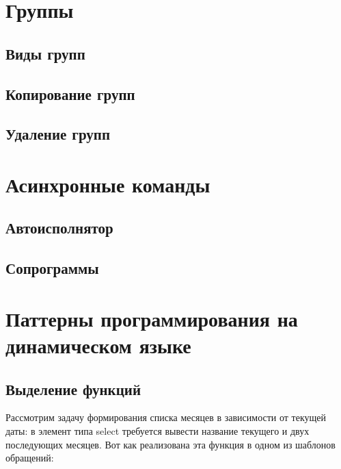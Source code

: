 \documentclass[10pt]{book}
\begin{document}
	\chapter{Группы}
	
	\section{Виды групп}
	
	\section{Копирование групп}
	
	\section{Удаление групп}
	
	\chapter{Асинхронные команды}
	
	\section{Автоисполнятор}
	
	\section{Сопрограммы}

	\chapter{Паттерны программирования на динамическом языке}
	
	\section{Выделение функций}
	
Рассмотрим задачу формирования списка месяцев в зависимости от текущей даты: в элемент типа select требуется вывести название текущего и двух последующих месяцев. Вот как реализована эта функция в одном из шаблонов обращений:
\end{document}
